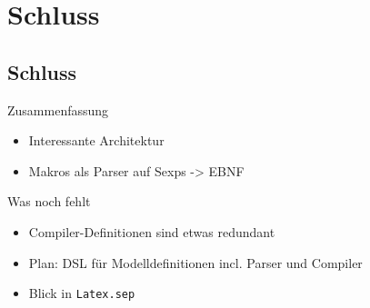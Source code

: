 \documentclass{beamer}
\begin{document}
\section{Schluss}
\subsection{Schluss}

\begin{frame}{Zusammenfassung}
  \begin{itemize}
  \item Interessante Architektur
  \item Makros als Parser auf Sexps -> EBNF
  \end{itemize}
\end{frame}

\begin{frame}{Was noch fehlt}
  \begin{itemize}
  \item Compiler-Definitionen sind etwas redundant
  \item Plan: DSL für Modelldefinitionen incl. Parser und Compiler
  \item Blick in \texttt{Latex.sep}
  \end{itemize}
\end{frame}
\end{document}
